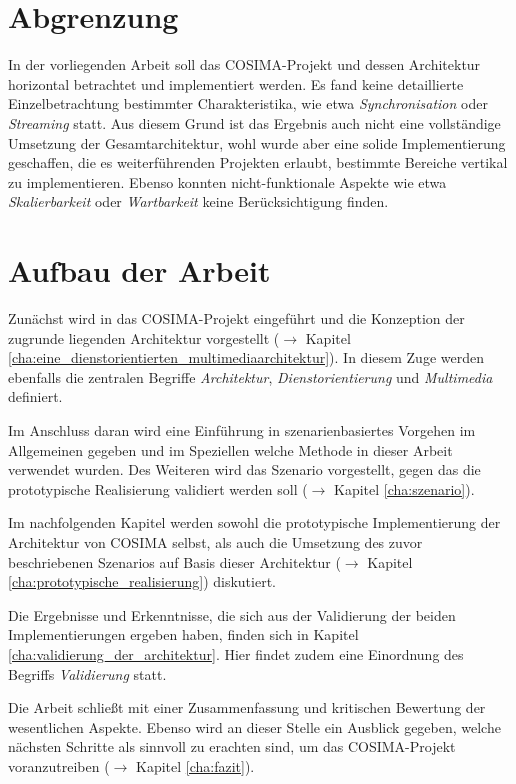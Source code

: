 
\section{Abgrenzung} %
\label{sec:abgrenzung}

  In der vorliegenden Arbeit soll das COSIMA-Projekt und dessen Architektur horizontal betrachtet und implementiert werden. Es fand keine detaillierte Einzelbetrachtung bestimmter Charakteristika, wie etwa \emph{Synchronisation} oder \emph{Streaming} statt. Aus diesem Grund ist das Ergebnis auch nicht eine vollständige Umsetzung der Gesamtarchitektur, wohl wurde aber eine solide Implementierung geschaffen, die es weiterführenden Projekten erlaubt, bestimmte Bereiche vertikal zu implementieren. Ebenso konnten nicht-funktionale Aspekte wie etwa \emph{Skalierbarkeit} oder \emph{Wartbarkeit} keine Berücksichtigung finden.


\section{Aufbau der Arbeit} %
\label{sec:aufbau_der_arbeit}

  Zunächst wird in das COSIMA-Projekt eingeführt und die Konzeption der zugrunde liegenden Architektur vorgestellt ($\to$ Kapitel \ref{cha:eine_dienstorientierten_multimediaarchitektur}). In diesem Zuge werden ebenfalls die zentralen Begriffe \emph{Architektur}, \emph{Dienstorientierung} und \emph{Multimedia} definiert.
  
  Im Anschluss daran wird eine Einführung in szenarienbasiertes Vorgehen im Allgemeinen gegeben und im Speziellen welche Methode in dieser Arbeit verwendet wurden. Des Weiteren wird das Szenario vorgestellt, gegen das die prototypische Realisierung validiert werden soll ($\to$ Kapitel \ref{cha:szenario}).
  
  Im nachfolgenden Kapitel werden sowohl die prototypische Implementierung der Architektur von COSIMA selbst, als auch die Umsetzung des zuvor beschriebenen Szenarios auf Basis dieser Architektur ($\to$ Kapitel \ref{cha:prototypische_realisierung}) diskutiert.
  
  Die Ergebnisse und Erkenntnisse, die sich aus der Validierung der beiden Implementierungen ergeben haben, finden sich in Kapitel \ref{cha:validierung_der_architektur}. Hier findet zudem eine Einordnung des Begriffs \emph{Validierung} statt.
  
  Die Arbeit schließt mit einer Zusammenfassung und kritischen Bewertung der wesentlichen Aspekte. Ebenso wird an dieser Stelle ein Ausblick gegeben, welche nächsten Schritte als sinnvoll zu erachten sind, um das COSIMA-Projekt voranzutreiben ($\to$ Kapitel \ref{cha:fazit}).
  

